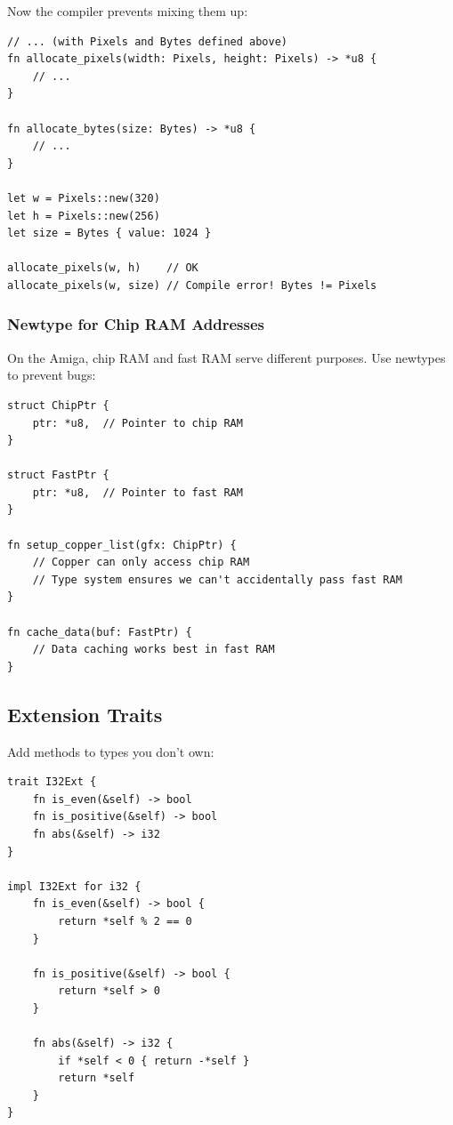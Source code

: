 Now the compiler prevents mixing them up:

\begin{lstlisting}
// ... (with Pixels and Bytes defined above)
fn allocate_pixels(width: Pixels, height: Pixels) -> *u8 {
    // ...
}

fn allocate_bytes(size: Bytes) -> *u8 {
    // ...
}

let w = Pixels::new(320)
let h = Pixels::new(256)
let size = Bytes { value: 1024 }

allocate_pixels(w, h)    // OK
allocate_pixels(w, size) // Compile error! Bytes != Pixels
\end{lstlisting}

\subsubsection{Newtype for Chip RAM Addresses}

On the Amiga, chip RAM and fast RAM serve different purposes. Use newtypes to prevent bugs:

\begin{lstlisting}
struct ChipPtr {
    ptr: *u8,  // Pointer to chip RAM
}

struct FastPtr {
    ptr: *u8,  // Pointer to fast RAM
}

fn setup_copper_list(gfx: ChipPtr) {
    // Copper can only access chip RAM
    // Type system ensures we can't accidentally pass fast RAM
}

fn cache_data(buf: FastPtr) {
    // Data caching works best in fast RAM
}
\end{lstlisting}

\subsection{Extension Traits}

Add methods to types you don't own:

\begin{lstlisting}
trait I32Ext {
    fn is_even(&self) -> bool
    fn is_positive(&self) -> bool
    fn abs(&self) -> i32
}

impl I32Ext for i32 {
    fn is_even(&self) -> bool {
        return *self % 2 == 0
    }

    fn is_positive(&self) -> bool {
        return *self > 0
    }

    fn abs(&self) -> i32 {
        if *self < 0 { return -*self }
        return *self
    }
}
\end{lstlisting}

